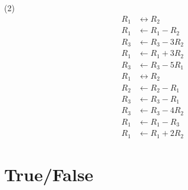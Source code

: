 \begin{tasks}[resume, style=enumerate](2)
\task
  \begin{align*}
    R_{1} &\leftrightarrow R_{2} \\
    R_{1} &\gets R_{1} - R_{2} \\
    R_{3} &\gets R_{3} - 3R_{2} \\
    R_{1} &\gets R_{1} + 3R_{2} \\
    R_{3} &\gets R_{3} - 5R_{1} \\
    R_{1} &\leftrightarrow R_{2}
  \end{align*}
\task
  \begin{align*}
    R_2 &\gets R_2 - R_1 \\
    R_3 &\gets R_3 - R_1 \\
    R_3 &\gets R_3 - 4R_2 \\
    R_1 &\gets R_1 - R_3 \\
    R_1 &\gets R_1 + 2R_2
  \end{align*}
\end{tasks}

\section{True/False}

\trueFalseHeader

